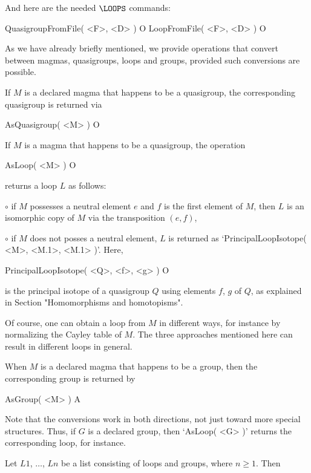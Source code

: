 \medskip

And here are the needed ${\LOOPS}$ commands:

\>QuasigroupFromFile( <F>, <D> ) O
\>LoopFromFile( <F>, <D> ) O


As we have already briefly mentioned, we provide operations that convert
between magmas, quasigroups, loops and groups, provided such conversions are
possible.

If $M$ is a declared magma that happens to be a quasigroup, the corresponding
quasigroup is returned via

\>AsQuasigroup( <M> ) O

If $M$ is a magma that happens to be a quasigroup, the operation

\>AsLoop( <M> ) O

returns a loop $L$ as follows:
\beginlist%
\item{$\circ$}
    if $M$ possesses a neutral element $e$ and $f$ is the first element of $M$,
    then $L$ is an isomorphic copy of $M$ via the transposition $(e,f)$,
\item{$\circ$}
    if $M$ does not posses a neutral element, $L$ is returned as
    `PrincipalLoopIsotope( <M>, <M.1>, <M.1> )'.
\endlist
Here,

\>PrincipalLoopIsotope( <Q>, <f>, <g> ) O

is the principal isotope of a quasigroup $Q$ using elements $f$, $g$ of $Q$, as
explained in Section "Homomorphisms and homotopisms".

Of course, one can obtain a loop from $M$ in different ways, for instance by
normalizing the Cayley table of $M$. The three approaches mentioned here can
result in different loops in general.

When $M$ is a declared magma that happens to be a group, then the corresponding
group is returned by

\>AsGroup( <M> ) A

Note that the conversions work in both directions, not just toward more special
structures. Thus, if $G$ is a declared group, then `AsLoop( <G> )' returns the
corresponding loop, for instance.


\noindent Let $L1$, $\dots$, $Ln$ be a list consisting of loops and groups,
where $n\ge 1$. Then

